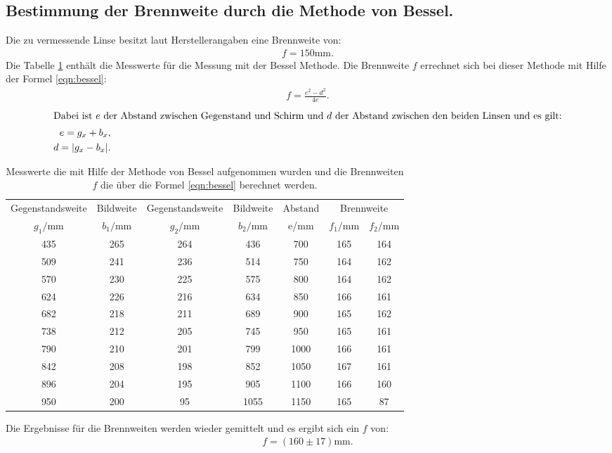 \subsection{Bestimmung der Brennweite durch die Methode von Bessel.}
Die zu vermessende Linse besitzt laut Herstellerangaben eine Brennweite von:
\begin{align*}
  f=150\si{\milli\meter}.
\end{align*}
Die Tabelle \ref{tab:bessel} enthält die Messwerte für die Messung mit der Bessel Methode.
Die Brennweite $f$ errechnet sich bei dieser Methode mit Hilfe der Formel \ref{eqn:bessel}:
\begin{align}
    f=\frac{e^2-d^2}{4e}\label{eqn:bessel}.
\end{align}
\begin{align*}
    \intertext{Dabei ist $e$ der Abstand zwischen Gegenstand und Schirm und
    $d$ der Abstand zwischen den beiden Linsen und es gilt:}
    e=g_x+b_x,\\
    d=|g_x-b_x|.
\end{align*}
\begin{table}
    \centering
    \caption{Messwerte die mit Hilfe der Methode von Bessel aufgenommen wurden
    und die Brennweiten $f$ die über die Formel \eqref{eqn:bessel} berechnet werden.}
    \label{tab:bessel}
    \begin{tabular}{c c c c c c c}
    \toprule
    Gegenstandsweite   & Bildweite &  Gegenstandsweite   & Bildweite & Abstand  & \multicolumn{2}{c}{Brennweite}\\
    $g_1/\si{\milli\meter}$ & $b_1/\si{\milli\meter}$ &$g_2/\si{\milli\meter}$ & $b_2/\si{\milli\meter}$ & e/\si{\milli\meter} & $f_1/\si{\milli\meter}$ & $f_2/\si{\milli\meter}$\\
    \midrule
  435  &   265 &   264 &   436  & 700  & 165 & 164 \\
  509  &   241 &   236 &   514  & 750  & 164 & 162 \\
  570  &   230 &   225 &   575  & 800  & 164 & 162 \\
  624  &   226 &   216 &   634  & 850  & 166 & 161 \\
  682  &   218 &   211 &   689  & 900  & 165 & 162 \\
  738  &   212 &   205 &   745  & 950  & 165 & 161 \\
  790  &   210 &   201 &   799  & 1000 & 166 & 161 \\
  842  &   208 &   198 &   852  & 1050 & 167 & 161 \\
  896  &   204 &   195 &   905  & 1100 & 166 & 160 \\
  950  &   200 &    95 &   1055 & 1150 & 165 & 87  \\
  \bottomrule
\end{tabular}
\end{table}
\FloatBarrier
Die Ergebnisse für die Brennweiten
werden wieder gemittelt und es ergibt sich ein $f$ von:
\begin{align*}
  f=(160\pm17)\si{\milli\meter}.
\end{align*}

